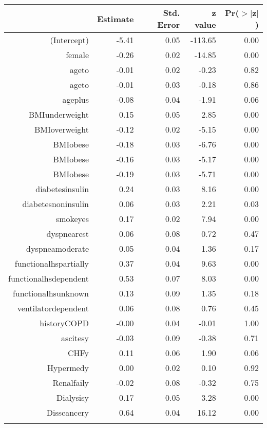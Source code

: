 \bigskip\bigskip
\centering
\begin{tabular}{rrrrr}
  \hline
 & Estimate & Std. Error & z value & Pr($>$$|$z$|$) \\ 
  \hline
(Intercept) & -5.41 & 0.05 & -113.65 & 0.00 \\ 
  female & -0.26 & 0.02 & -14.85 & 0.00 \\ 
  age\-65\-to\-74 & -0.01 & 0.02 & -0.23 & 0.82 \\ 
  age\-75\-to\-84 & -0.01 & 0.03 & -0.18 & 0.86 \\ 
  age\-85\-plus & -0.08 & 0.04 & -1.91 & 0.06 \\ 
  BMI\-underweight & 0.15 & 0.05 & 2.85 & 0.00 \\ 
  BMI\-overweight & -0.12 & 0.02 & -5.15 & 0.00 \\ 
  BMI\-obese\-1 & -0.18 & 0.03 & -6.76 & 0.00 \\ 
  BMI\-obese\-2 & -0.16 & 0.03 & -5.17 & 0.00 \\ 
  BMI\-obese\-3 & -0.19 & 0.03 & -5.71 & 0.00 \\ 
  diabetes\-insulin & 0.24 & 0.03 & 8.16 & 0.00 \\ 
  diabetes\-noninsulin & 0.06 & 0.03 & 2.21 & 0.03 \\ 
  smoke\-yes & 0.17 & 0.02 & 7.94 & 0.00 \\ 
  dyspnea\-rest & 0.06 & 0.08 & 0.72 & 0.47 \\ 
  dyspnea\-moderate & 0.05 & 0.04 & 1.36 & 0.17 \\ 
  functional\-hs\-partially & 0.37 & 0.04 & 9.63 & 0.00 \\ 
  functional\-hs\-dependent & 0.53 & 0.07 & 8.03 & 0.00 \\ 
  functional\-hs\-unknown & 0.13 & 0.09 & 1.35 & 0.18 \\ 
  ventilator\-dependent & 0.06 & 0.08 & 0.76 & 0.45 \\ 
  history\-COPD & -0.00 & 0.04 & -0.01 & 1.00 \\ 
  ascites\-y & -0.03 & 0.09 & -0.38 & 0.71 \\ 
  CHF\-y & 0.11 & 0.06 & 1.90 & 0.06 \\ 
  Hyper\-med\-y & 0.00 & 0.02 & 0.10 & 0.92 \\ 
  Renal\-fail\-y & -0.02 & 0.08 & -0.32 & 0.75 \\ 
  Dialysis\-y & 0.17 & 0.05 & 3.28 & 0.00 \\ 
  Diss\-cancer\-y & 0.64 & 0.04 & 16.12 & 0.00 \\ 
$$
\end{tabular}
